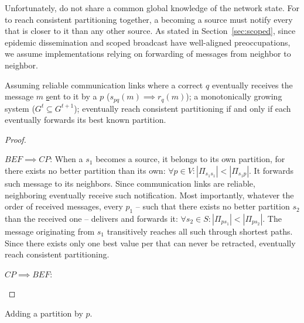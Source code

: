 Unfortunately, \processes do not share a common global knowledge of
the network state. For \processes to reach consistent partitioning
together, a \process becoming a source must notify every \process that
is closer to it than any other source. As stated in
Section~\ref{sec:scoped}, since epidemic dissemination and scoped
broadcast have well-aligned preoccupations, we assume implementations
relying on forwarding of messages from neighbor to neighbor. 

\begin{theorem}
  Assuming reliable communication links where a correct \process $q$
  eventually receives the message $m$ \underline{s}ent to it by a
  \process $p$ ($s_{pq}(m) \implies r_{q}(m)$); a monotonically
  growing system ($G^t \subseteq G^{t+1}$); \processes eventually
  reach consistent partitioning if and only if each \process
  eventually forwards its best known partition.
\end{theorem}

\begin{proof}
  \begin{asparadesc}
  \item [$BEF \implies CP$:] When a \process $s_1$ becomes a source,
    it belongs to its own partition, for there exists no better
    partition than its own: $\forall p \in V: |\Pi_{s_1 s_1}| <
    |\Pi_{s_1 p}|$. It forwards such message to its neighbors. Since
    communication links are reliable, neighboring \processes
    eventually receive such notification. Most importantly, whatever
    the order of received messages, every \process $p_1$ -- such that
    there exists no better partition $s_2$ than the received one --
    delivers and forwards it: $\forall s_2 \in S: |\Pi_{p s_1}| <
    |\Pi_{p s_2}|$. The message originating from $s_1$ transitively
    reaches all such \processes through shortest paths. Since there
    exists only one best value per \process that can never be
    retracted, \processes eventually reach consistent
    partitioning. %
  \item [$CP \implies BEF$:] 
  \end{asparadesc}
\end{proof}

\begin{algorithm}
  
  \caption{\label{algo:add}Adding a partition by \Process $p$.}
\end{algorithm}


